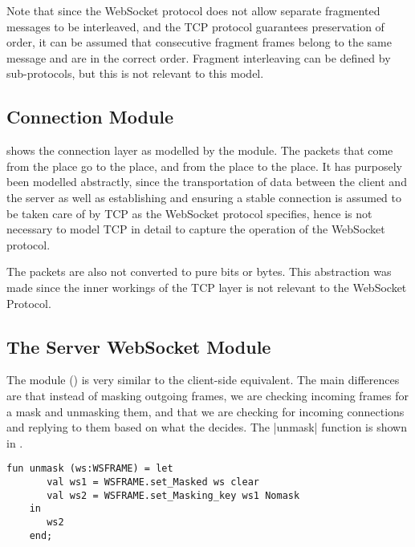 			Note that since the WebSocket protocol does not allow separate fragmented
			messages to be interleaved, and the TCP protocol guarantees preservation of
			order, it can be assumed that consecutive fragment frames belong to the same
			message and are in the correct order.
			Fragment interleaving can be defined by sub-protocols, but this is not
			relevant to this model.
			
\subsection{Connection Module}

	
	 shows the connection layer as modelled by the
	 module. The packets that come from the  place go to the  place, and from the
	 place to the  place. It has
	purposely been modelled abstractly, since the transportation of data between the
	client and the server as well as establishing and ensuring a stable
	connection is assumed to be taken care of by TCP as the WebSocket protocol
	specifies, hence is not necessary to model TCP in detail to capture the
	operation of the WebSocket protocol.
	
	The packets are also not converted to pure bits or bytes. This abstraction was
	made since the inner workings of the TCP layer is not relevant to the WebSocket
	Protocol.

\subsection{The Server WebSocket Module}
	
	
	The  module () is very similar
	to the client-side equivalent.
	The main differences are that instead of masking outgoing frames, we are checking
	incoming frames for a mask and unmasking them, and that we are checking for
	incoming connections and replying to them based on what the  decides. The |unmask| function is shown in .
	 
	\begin{lstlisting}[label=lst:unmask,caption=unmask,gobble=1,float=h]
	fun unmask (ws:WSFRAME) = let
	   val ws1 = WSFRAME.set_Masked ws clear
	   val ws2 = WSFRAME.set_Masking_key ws1 Nomask
	in 
	   ws2
	end;
	\end{lstlisting}
		
